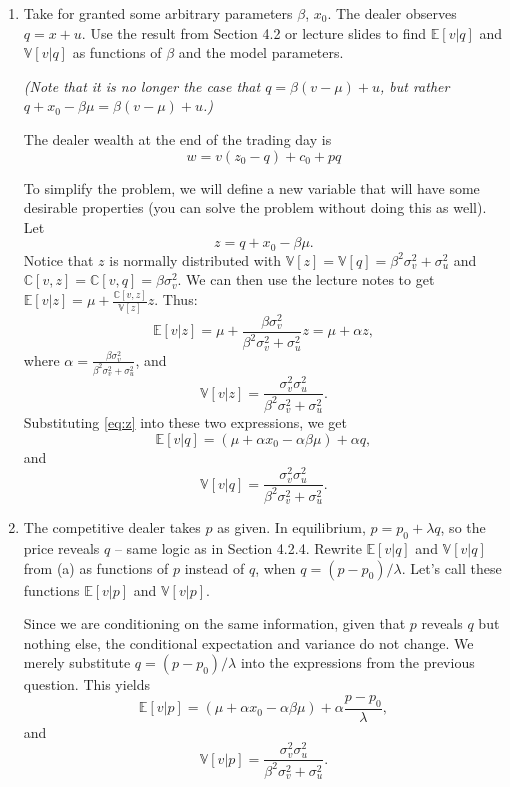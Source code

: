 \documentclass[11pt
, answers
]{exam}
\begin{document}
\begin{enumerate}[label=(\alph*). ]
\item Take for granted some arbitrary parameters $\beta$, $x_{0}$. The dealer observes $q=x+u$. 
Use the result from Section 4.2 or lecture slides to find $\mathbb{E}[v|q]$ and $\mathbb{V}[v|q]$ as functions of $\beta$ and the model parameters.

\emph{(Note that it is no longer the case that $q = \beta(v-\mu)+u$, but rather $q+x_{0}-\beta \mu = \beta(v-\mu)+u$.)}

\begin{solution}
The dealer wealth at the end of the trading day is
\[
w = v(z_{0}-q) + c_{0} + pq
\]

To simplify the problem, we will define a new variable that will have some desirable properties (you can solve the problem without doing this as well). Let 
\begin{equation} \label{eq:z}
z=q+x_{0}-\beta \mu.
\end{equation}
 Notice that $z$ is normally distributed with $\mathbb{V}[z]=\mathbb{V}[q]=\beta^{2}\sigma^{2}_{v}+\sigma^{2}_{u}$ and $\mathbb{C}[v,z]=\mathbb{C}[v,q]=\beta \sigma^{2}_{v}$. We can then use the lecture notes to get $\mathbb{E}[v|z]=\mu+\frac{\mathbb{C}[v,z]}{\mathbb{V}[z]}z$. Thus:
\[
\mathbb{E}[v|z] = \mu+\frac{\beta \sigma^{2}_{v}}{\beta^{2}\sigma^{2}_{v}+\sigma^{2}_{u}} z =\mu + \alpha z,
\]
where $\alpha = \frac{\beta \sigma^{2}_{v}}{\beta^{2}\sigma^{2}_{v}+\sigma^{2}_{u}}$, and
\[
\mathbb{V}[v|z]=\frac{\sigma^{2}_{v}\sigma_{u}^{2}}{\beta^{2}\sigma^{2}_{v}+\sigma^{2}_{u}}.
\]
Substituting \eqref{eq:z} into these two expressions, we get 
\[
\mathbb{E}[v|q] = (\mu + \alpha x_{0} - \alpha \beta \mu)  + \alpha q,
\]
and 
\[
\mathbb{V}[v|q]=\frac{\sigma^{2}_{v}\sigma_{u}^{2}}{\beta^{2}\sigma^{2}_{v}+\sigma^{2}_{u}}.
\]
\end{solution}


\item The competitive dealer takes $p$ as given. In equilibrium, $p=p_{0}+\lambda q$, so the price reveals $q$ -- same logic as in Section 4.2.4. Rewrite $\mathbb{E}[v|q]$ and $\mathbb{V}[v|q]$ from (a) as functions of $p$ instead of $q$, when $q=(p-p_{0})/\lambda$. Let's call these functions $\mathbb{E}[v|p]$ and $\mathbb{V}[v|p]$.

\begin{solution}
Since we are conditioning on the same information, given that $p$ reveals $q$ but nothing else, the conditional expectation and variance do not change. We merely substitute $q=(p-p_{0})/\lambda$ into the expressions from the previous question. This yields
\[
\mathbb{E}[v|p] =  (\mu + \alpha x_{0} - \alpha \beta \mu) +\alpha \frac{p-p_{0}}{\lambda},
\]
and
\[
\mathbb{V}[v|p]=\frac{\sigma^{2}_{v}\sigma_{u}^{2}}{\beta^{2}\sigma^{2}_{v}+\sigma^{2}_{u}}.
\]
\end{solution}


\end{enumerate}
\end{document}
